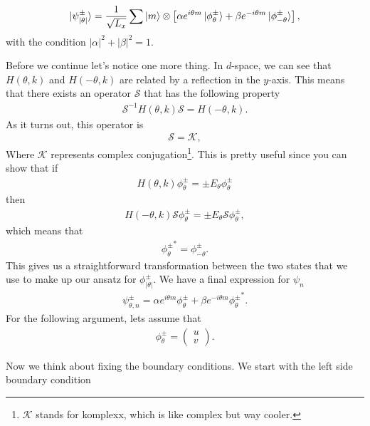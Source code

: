 \begin{align}
    \ket{\psi^\pm_{|\theta|} }= \frac{1}{\sqrt{L_x}}\sum \ket{m}  \otimes \left [ \alpha e^{i \theta m} \ket{\phi_{\theta}^{\pm}} + \beta e^{-i \theta m} \ket{\phi_{-\theta}^{\pm}} \right ],
\end{align}
with the condition $|\alpha|^2 + |\beta|^2=1$.\par
Before we continue let's notice one more thing. In $d$-space, we can see that $H(\theta, k) $ and $H(-\theta, k)$  are related by a reflection in the $y$-axis. This means that there exists an operator $\mathcal{S}$ that has the following property
\begin{align}
    \mathcal{S}^{-1} H(\theta,k)\mathcal{S}  = H(-\theta,k).
\end{align}
As it turns out, this operator is
\begin{align}
    \mathcal{S} = \mathcal{K},
\end{align}
Where $\mathcal{K}$ represents complex conjugation\footnote{$\mathcal{K}$ stands for komplexx, which is like complex but way cooler.}. This is pretty useful since you can show that if
\begin{align}
    H(\theta,k)\phi^\pm _{\theta} = \pm E_\theta \phi^\pm _{\theta}
\end{align}
then 
\begin{align}
    H(-\theta,k) \mathcal{S} \phi^\pm _{\theta} = \pm E_\theta \mathcal{S} \phi^\pm _{\theta},
\end{align}
which means that
\begin{align}
    {\phi^{\pm} _{\theta}}^*  = \phi^\pm _{-\theta}.
\end{align}
This gives us a straightforward transformation between the two states that we use to make up our ansatz for $\phi^\pm_{|\theta|}$. We have a final expression for $\psi_n$
\begin{align}
    \psi_{\theta,n} ^{\pm} = \alpha e^{i \theta m} \phi_{\theta}^{\pm} + \beta e^{-i \theta m} {\phi_{\theta}^{\pm}}^*.
\end{align}
For the following argument, lets assume that 
\begin{align}
    \phi_{\theta}^{\pm} = \begin{pmatrix}
    u \\ 
    v
    \end{pmatrix}.
\end{align}\par
Now we think about fixing the boundary conditions. We start with the left side boundary condition
